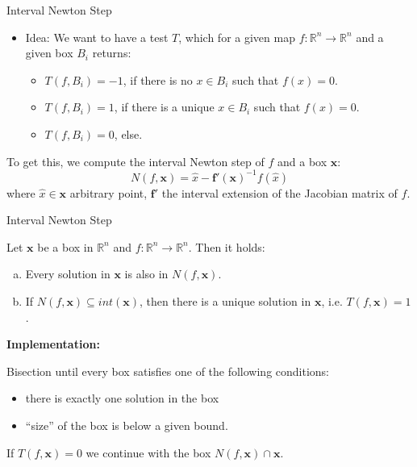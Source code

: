 \documentclass[german,10pt,xcolor=colortbl,compress]{beamer}
\begin{document}
\begin{frame}{Interval Newton Step}
    \begin{itemize}
    \item Idea: We want to have a test $T$, which for a given map $f: \mathbb{R}^n \to
        \mathbb{R}^n$ and a given box $B_i$ returns:
        \begin{itemize}
            \item $T(f,B_i)=-1$, if there is no $x \in B_i$ such that $f(x)=0$.
            \item $T(f,B_i)=1$,  if there is a unique $x \in B_i$ such that $f(x)=0$.
            \item $T(f,B_i)=0$, else.
        \end{itemize}
    \end{itemize}
    \pause
    To get this, we compute the interval Newton step of $f$ and a box $\mathbf{x}$: $$
    N(f, \mathbf{x})= \hat{x} - \mathbf{f'}(\mathbf{x})^{-1}f(\hat{x})$$ where $\hat{x}
    \in \mathbf{x}$ arbitrary point, $\mathbf{f'}$ the interval extension of the Jacobian
    matrix of $f$.
\end{frame}

\begin{frame}{Interval Newton Step}
    \begin{theorem}
        Let $\mathbf{x}$ be a box in $\mathbb{R}^n$ and $f:\mathbb{R}^n\to \mathbb{R}^n$.
        Then it holds:
        \begin{enumerate}[a)]
            \item Every solution in $\mathbf{x}$ is also in $N(f,\mathbf{x})$.
            \item If $N(f,\mathbf{x}) \subseteq int(\mathbf{x})$, then there is a unique
                solution in $\mathbf{x}$, i.e. $T(f,\mathbf{x})=1$.
        \end{enumerate}
    \end{theorem}
    \pause

    \textbf{Implementation:}

    Bisection until every box satisfies one of the following conditions:
    \begin{itemize}
        \item there is exactly one solution in the box
        \item \enquote{size} of the box is below a given bound.
    \end{itemize}
    If $T(f, \mathbf x) = 0$ we continue with the box $N(f,\mathbf x) \cap \mathbf x$.
\end{frame}
\end{document}
